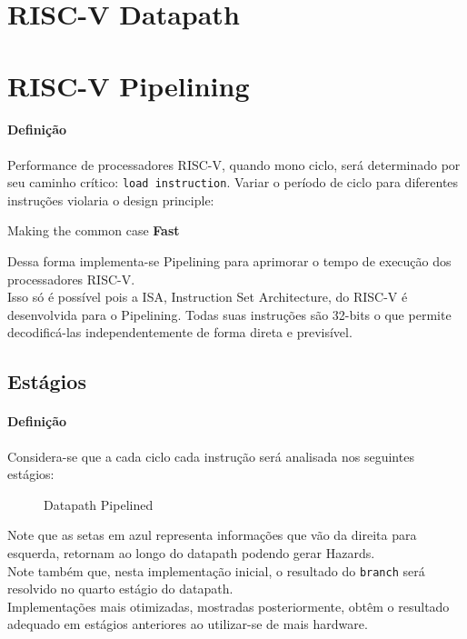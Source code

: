 \documentclass{article}
\begin{document}
\newpage\section{RISC-V Datapath}


\newpage\section{RISC-V Pipelining}
\paragraph{Definição}Performance de processadores RISC-V, quando mono ciclo, será determinado por seu caminho crítico: \texttt{load instruction}. Variar o período de ciclo para diferentes instruções violaria o design principle:
\begin{phrase}
    Making the common case \textbf{Fast}
\end{phrase}
\noindent Dessa forma implementa-se Pipelining para aprimorar o tempo de execução dos processadores RISC-V.\\

\noindent Isso só é possível pois a ISA, Instruction Set Architecture, do RISC-V é desenvolvida para o Pipelining. Todas suas instruções são 32-bits o que permite decodificá-las independentemente de forma direta e previsível.

\subsection{Estágios}
\paragraph{Definição}Considera-se que a cada ciclo cada instrução será analisada nos seguintes estágios:
\begin{figure}[H]
    \centering
    \caption{Datapath Pipelined}
    \label{datapath_pipelined}
\end{figure}
\noindent Note que as setas em azul representa informações que vão da direita para esquerda, retornam ao longo do datapath podendo gerar Hazards.\\

\noindent Note também que, nesta implementação inicial, o resultado do \texttt{branch} será resolvido no quarto estágio do datapath.\\

\noindent Implementações mais otimizadas, mostradas posteriormente, obtêm o resultado adequado em estágios anteriores ao utilizar-se de mais hardware.
\end{document}
